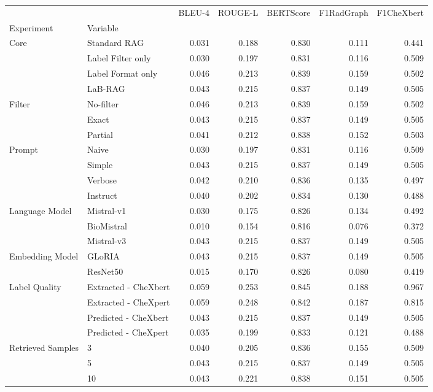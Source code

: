 \begin{tabular}{llrrrrr}
\toprule
 &  & BLEU-4 & ROUGE-L & BERTScore & F1RadGraph & F1CheXbert \\
Experiment & Variable &  &  &  &  &  \\
\midrule
\multirow[t]{4}{*}{Core} & Standard RAG & 0.031 & 0.188 & 0.830 & 0.111 & 0.441 \\
 & Label Filter only & 0.030 & 0.197 & 0.831 & 0.116 & 0.509 \\
 & Label Format only & 0.046 & 0.213 & 0.839 & 0.159 & 0.502 \\
 & LaB-RAG & 0.043 & 0.215 & 0.837 & 0.149 & 0.505 \\
\cline{1-7}
\multirow[t]{3}{*}{Filter} & No-filter & 0.046 & 0.213 & 0.839 & 0.159 & 0.502 \\
 & Exact & 0.043 & 0.215 & 0.837 & 0.149 & 0.505 \\
 & Partial & 0.041 & 0.212 & 0.838 & 0.152 & 0.503 \\
\cline{1-7}
\multirow[t]{4}{*}{Prompt} & Naive & 0.030 & 0.197 & 0.831 & 0.116 & 0.509 \\
 & Simple & 0.043 & 0.215 & 0.837 & 0.149 & 0.505 \\
 & Verbose & 0.042 & 0.210 & 0.836 & 0.135 & 0.497 \\
 & Instruct & 0.040 & 0.202 & 0.834 & 0.130 & 0.488 \\
\cline{1-7}
\multirow[t]{3}{*}{Language Model} & Mistral-v1 & 0.030 & 0.175 & 0.826 & 0.134 & 0.492 \\
 & BioMistral & 0.010 & 0.154 & 0.816 & 0.076 & 0.372 \\
 & Mistral-v3 & 0.043 & 0.215 & 0.837 & 0.149 & 0.505 \\
\cline{1-7}
\multirow[t]{2}{*}{Embedding Model} & GLoRIA & 0.043 & 0.215 & 0.837 & 0.149 & 0.505 \\
 & ResNet50 & 0.015 & 0.170 & 0.826 & 0.080 & 0.419 \\
\cline{1-7}
\multirow[t]{4}{*}{Label Quality} & Extracted - CheXbert & 0.059 & 0.253 & 0.845 & 0.188 & 0.967 \\
 & Extracted - CheXpert & 0.059 & 0.248 & 0.842 & 0.187 & 0.815 \\
 & Predicted - CheXbert & 0.043 & 0.215 & 0.837 & 0.149 & 0.505 \\
 & Predicted - CheXpert & 0.035 & 0.199 & 0.833 & 0.121 & 0.488 \\
\cline{1-7}
\multirow[t]{3}{*}{Retrieved Samples} & 3 & 0.040 & 0.205 & 0.836 & 0.155 & 0.509 \\
 & 5 & 0.043 & 0.215 & 0.837 & 0.149 & 0.505 \\
 & 10 & 0.043 & 0.221 & 0.838 & 0.151 & 0.505 \\
\cline{1-7}
\bottomrule
\end{tabular}
